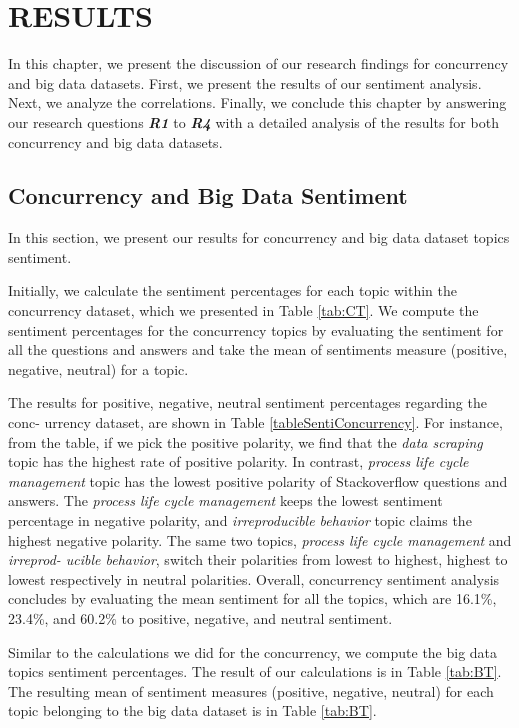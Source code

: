 \chapter{RESULTS}
In this chapter, we present the discussion of our research findings for concurrency and big data datasets. First, we present the results of our sentiment analysis. Next, we analyze the correlations. Finally, we conclude this chapter by answering our research questions \emph{\textbf{R1}} to \emph{\textbf{R4}} with a detailed analysis of the results for both concurrency and big data datasets.

\section{Concurrency and Big Data Sentiment}
In this section, we present our results for concurrency and big data dataset topics sentiment. 

Initially, we calculate the sentiment percentages for each topic within the concurrency dataset, which we presented in Table \ref{tab:CT}. We compute the sentiment percentages for the concurrency topics by evaluating the sentiment for all the questions and answers and take the mean of sentiments measure (positive, negative, neutral) for a topic. 

The results for positive, negative, neutral sentiment percentages regarding the conc- urrency dataset, are shown in Table \ref{tableSentiConcurrency}. For instance, from the table,
if we pick the positive polarity, we find that the \emph{data scraping} topic has the highest rate of positive polarity. In contrast, \emph{process life cycle management} topic has the lowest positive polarity of Stackoverflow questions and answers. The 
\emph{process life cycle management} keeps the lowest sentiment percentage in negative polarity, and \emph{irreproducible behavior} topic claims the highest negative polarity. The same two topics, \emph{process life cycle management} and \emph{irreprod- ucible behavior}, switch their polarities from lowest to highest, highest to lowest respectively in neutral polarities. Overall, concurrency sentiment analysis concludes by evaluating the mean sentiment for all the topics, which are 16.1\%, 23.4\%, and 60.2\% to positive, negative, and neutral sentiment.


Similar to the calculations we did for the concurrency, we compute the big data topics sentiment percentages. The result of our calculations is in Table \ref{tab:BT}. The resulting mean of sentiment measures (positive, negative, neutral) for each topic belonging to the big data dataset is in Table \ref{tab:BT}.

